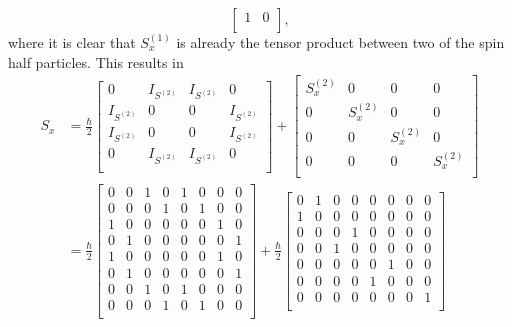 \begin{example}
\begin{equation}
\begin{bmatrix}
			1 & 0 \\
		\end{bmatrix},
	\end{equation} 
	where it is clear that $S^{(1)}_x$ is already the tensor product between two of the spin half particles. This results in
	\begin{equation}
		\begin{split}
			S_x&=\frac{\hbar}{2}\begin{bmatrix}
				0 & I_{S^{(2)}} & I_{S^{(2)}} & 0 \\
				I_{S^{(2)}} & 0 & 0 & I_{S^{(2)}} \\
				I_{S^{(2)}} & 0 & 0 & I_{S^{(2)}} \\
				0 & I_{S^{(2)}} & I_{S^{(2)}} & 0 \\
			\end{bmatrix}+\begin{bmatrix}
				S^{(2)}_x & 0 & 0 & 0 \\
				0 & S^{(2)}_x & 0 & 0 \\
				0 & 0 & S^{(2)}_x & 0 \\
				0 & 0 & 0 & S^{(2)}_x \\
			\end{bmatrix} \\
			&=\frac{\hbar}{2}\begin{bmatrix}
				0 & 0 & 1 & 0 & 1 & 0 & 0 & 0 \\
				0 & 0 & 0 & 1 & 0 & 1 & 0 & 0 \\
				1 & 0 & 0 & 0 & 0 & 0 & 1 & 0 \\
				0 & 1 & 0 & 0 & 0 & 0 & 0 & 1 \\
				1 & 0 & 0 & 0 & 0 & 0 & 1 & 0 \\
				0 & 1 & 0 & 0 & 0 & 0 & 0 & 1 \\
				0 & 0 & 1 & 0 & 1 & 0 & 0 & 0 \\
				0 & 0 & 0 & 1 & 0 & 1 & 0 & 0 \\
			\end{bmatrix}+\frac{\hbar}{2}\begin{bmatrix}
				0 & 1 & 0 & 0 & 0 & 0 & 0 & 0 \\
				1 & 0 & 0 & 0 & 0 & 0 & 0 & 0 \\
				0 & 0 & 0 & 1 & 0 & 0 & 0 & 0 \\
				0 & 0 & 1 & 0 & 0 & 0 & 0 & 0 \\
				0 & 0 & 0 & 0 & 0 & 1 & 0 & 0 \\
				0 & 0 & 0 & 0 & 1 & 0 & 0 & 0 \\
				0 & 0 & 0 & 0 & 0 & 0 & 0 & 1 \\

\end{bmatrix}
\end{split}
\end{equation}
\end{example}
